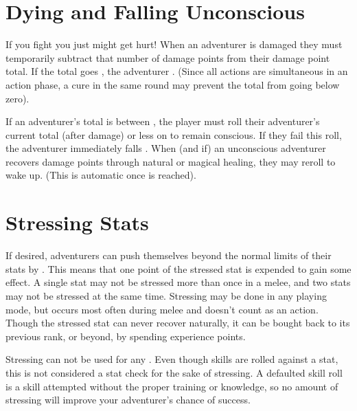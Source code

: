 \begin{multicols*}{2}
\section{Dying and Falling Unconscious}
If you fight you just might get hurt! When an adventurer is damaged they must temporarily subtract that number of damage points from their damage point total. If the total goes , the adventurer  . (Since all actions are simultaneous in an action phase, a cure in the same round may prevent the total from going below zero).

If an adventurer's \DP total is between , the player must roll their adventurer's current \DP total (after damage) or less on  to remain conscious. If they fail this roll, the adventurer immediately falls . When (and if) an unconscious adventurer recovers damage points through natural or magical healing, they may reroll to wake up. (This is automatic once  is reached).
\section{Stressing Stats}
If desired, adventurers can push themselves beyond the normal limits of their stats by . This means that one point of the stressed stat is expended  to gain some effect. A single stat may not be stressed more than once in a melee, and two stats may not be stressed at the same time. Stressing may be done in any playing mode, but occurs most often during melee and doesn't count as an action. Though the stressed stat can never recover naturally, it can be bought back to its previous rank, or beyond, by spending experience points.

Stressing can not be used for any . Even though  skills are rolled against a stat, this is not considered a stat check for the sake of stressing. A defaulted skill roll is a skill attempted without the proper training or knowledge, so no amount of stressing will improve your adventurer's chance of success.


\end{multicols*}
